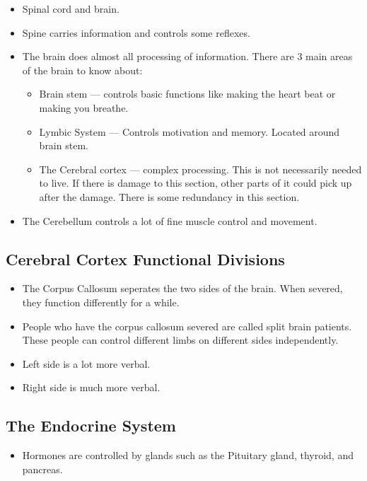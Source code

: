\documentclass[12pt]{article}
\begin{document}
\begin{itemize}
    \item Spinal cord and brain.
    \item Spine carries information and controls some reflexes.
    \item The brain does almost all processing of information. There are 3 main
        areas of the brain to know about:
        \begin{itemize}
            \item Brain stem --- controls basic functions like making the heart
                beat or making you breathe.
            \item  Lymbic System --- Controls motivation and memory. Located
                around brain stem.
            \item The Cerebral cortex --- complex processing. This is not
                necessarily needed to live. If there is damage to this section,
                other parts of it could pick up after the damage. There is some
                redundancy in this section.
        \end{itemize}
    \item The Cerebellum controls a lot of fine muscle control and movement.
\end{itemize}

\subsection{Cerebral Cortex Functional Divisions}

\begin{itemize}
    \item The Corpus Callosum seperates the two sides of the brain. When
        severed, they function differently for a while.
    \item People who have the corpus callosum severed are called split brain
        patients. These people can control different limbs on different sides
        independently.
    \item Left side is a lot more verbal.
    \item Right side is much more verbal.
\end{itemize}

\subsection{The Endocrine System}

\begin{itemize}
    \item Hormones are controlled by glands such as the Pituitary gland,
        thyroid, and pancreas.
\end{itemize}
\end{document}

